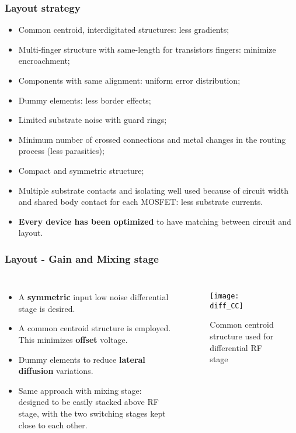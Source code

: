 \begin{frame}
	\frametitle{Layout strategy}
	\begin{itemize}
		\item Common centroid, interdigitated structures: less gradients;
		\item Multi-finger structure with same-length for transistors fingers: minimize encroachment;
		\item Components with same alignment: uniform error distribution;
		\item Dummy elements: less border effects;
		\item Limited substrate noise with guard rings;
		\item Minimum number of crossed connections and metal changes in the routing process (less parasitics);
		\item Compact and symmetric structure;
		\item Multiple substrate contacts and isolating well used because of circuit width and shared body contact for each MOSFET: less substrate currents.
		\item \textbf{Every device has been optimized} to have matching between circuit and layout.  
	\end{itemize}
\end{frame}

\begin{frame}
	\frametitle{Layout - Gain and Mixing stage}
	\begin{columns}
		\begin{itemize}
		\item A \textbf{symmetric} input low noise differential stage is desired.
		\item A common centroid structure is employed. This minimizes \textbf{offset} voltage.
		\item Dummy elements to reduce \textbf{lateral diffusion} variations.
		\item Same approach with mixing stage: designed to be easily stacked above RF stage, with the two switching stages kept close to each other.
		\end{itemize}
		\begin{figure}[H]
			\centering
			\texttt{[image: diff\_CC]}
			\caption{Common centroid structure used for differential RF stage}
			\label{fig:diff_CC}
		\end{figure}
	\end{columns}
\end{frame}

